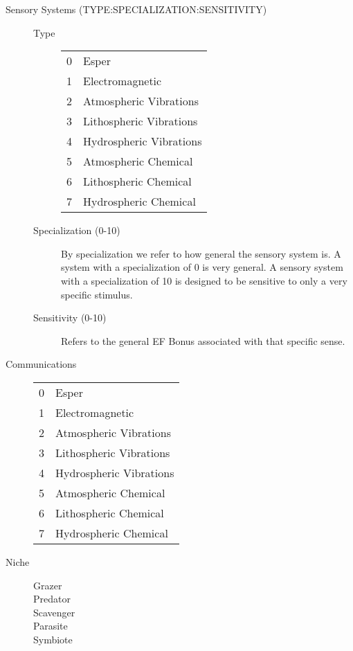 \begin{description}
	\item[Sensory Systems (TYPE:SPECIALIZATION:SENSITIVITY)]
	\begin{description}
		\item[Type]
			\begin{tabular}{ll}			    
			0	 &	Esper \\
			1	 &	Electromagnetic \\
			2	 &	Atmospheric Vibrations \\
			3	 &	Lithospheric Vibrations \\
			4	 &	Hydrospheric Vibrations \\
			5	 &	Atmospheric Chemical \\
			6	 &	Lithospheric Chemical \\
			7       & Hydrospheric Chemical \\
			\end{tabular}	

		\item[Specialization (0-10)]
		By specialization we refer to how general the sensory system is. A system 
		with a specialization of 0 is very general. A sensory system with a
		specialization of 10 is designed to be sensitive to only a very 
		specific stimulus.

		\item[Sensitivity (0-10)]
		Refers to the general EF Bonus associated with that specific sense.
	\end{description}

		\item[Communications]
		\begin{tabular}{ll}			    
		0       & Esper \\
		1       & Electromagnetic  \\
		2       & Atmospheric Vibrations \\
		3       & Lithospheric Vibrations \\
		4       & Hydrospheric Vibrations \\
		5       & Atmospheric Chemical \\
		6       & Lithospheric Chemical \\
		7       & Hydrospheric Chemical \\
		\end{tabular}
	\item[Niche]
	\begin{description}		
		\item[Grazer]
		\item[Predator ]
		\item[Scavenger]
		\item[Parasite]
		\item[Symbiote]
	\end{description}
\end{description}



